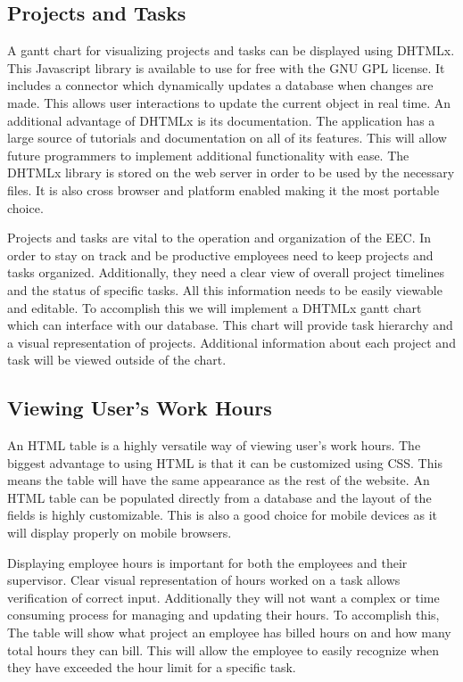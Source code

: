 \documentclass[letterpaper,10pt,titlepage,journal,compsoc,draftclsnofoot,onecolumn]{IEEEtran}
\newcommand\tab[1][1cm]{\hspace*{#1}}
\begin{document}
\subsection{Projects and Tasks}

\tab A gantt chart for visualizing projects and tasks can be displayed using DHTMLx. This Javascript library is available to use for free with the GNU GPL license. It includes a connector which dynamically updates a database when changes are made. This allows user interactions to update the current object in real time. An additional advantage of DHTMLx is its documentation. The application has a large source of tutorials and documentation on all of its features. This will allow future programmers to implement additional functionality with ease. The DHTMLx library is stored on the web server in order to be used by the necessary files. It is also cross browser and platform enabled making it the most portable choice.\newline

\tab Projects and tasks are vital to the operation and organization of the EEC. In order to stay on track and be productive employees need to keep projects and tasks organized. Additionally, they need a clear view of overall project timelines and the status of specific tasks. All this information needs to be easily viewable and editable. To accomplish this we will implement a DHTMLx gantt chart which can interface with our database. This chart will provide task hierarchy and a visual representation of projects. Additional information about each project and task will be viewed outside of the chart.


\subsection{Viewing User's Work Hours}

An HTML table is a highly versatile way of viewing user’s work hours. The biggest advantage to using HTML is that it can be customized using CSS. This means the table will have the same appearance as the rest of the website. An HTML table can be populated directly from a database and the layout of the fields is highly customizable. This is also a good choice for mobile devices as it will display properly on mobile browsers. \newline

\tab Displaying employee hours is important for both the employees and their supervisor. Clear visual representation of hours worked on a task allows verification of correct input. Additionally they will not want a complex or time consuming process for managing and updating their hours. To accomplish this, The table will show what project an employee has billed hours on and how many total hours they can bill. This will allow the employee to easily recognize when they have exceeded the hour limit for a specific task. 
\end{document}
